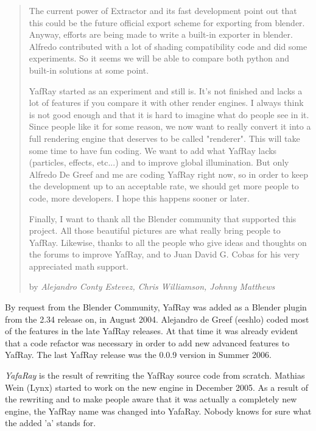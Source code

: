 \begin{quotation}
The current power of Extractor and its fast development point out that this could be the future official export scheme for exporting from blender. Anyway, efforts are being made to write a built-in exporter in blender. Alfredo contributed with a lot of shading compatibility code and did some experiments. So it seems we will be able to compare both python and built-in solutions at some point.

YafRay started as an experiment and still is. It's not finished and lacks a lot of features if you compare it with other render engines. I always think is not good enough and that it is hard to imagine what do people see in it. Since people like it for some reason, we now want to really convert it into a full rendering engine that deserves to be called "renderer". This will take some time to have fun coding. We want to add what YafRay lacks (particles, effects, etc...) and to improve global illumination. But only Alfredo De Greef and me are coding YafRay right now, so in order to keep the development up to an acceptable rate, we should get more people to code, more developers. I hope this happens sooner or later.

Finally, I want to thank all the Blender community that supported this project. All those beautiful pictures are what really bring people to YafRay. Likewise, thanks to all the people who give ideas and thoughts on the forums to improve YafRay, and to Juan David G. Cobas for his very appreciated math support.
\begin{flushright}
by \textit{Alejandro Conty Estevez, Chris Williamson, Johnny Matthews}
\end{flushright}
\end{quotation}

By request from the Blender Community, YafRay was added as a Blender plugin from the 2.34 release on, in August 2004. Alejandro de Greef (eeshlo) coded most of the features in the late YafRay releases. At that time it was already evident that a code refactor was necessary in order to add new advanced features to YafRay. The last YafRay release was the 0.0.9 version in Summer 2006.


\textit{YafaRay} is the result of rewriting the YafRay source code from scratch. Mathias Wein (Lynx) started to work on the new engine in December 2005. As a result of the rewriting and to make people aware that it was actually a completely new engine, the YafRay name was changed into YafaRay. Nobody knows for sure what the added 'a' stands for.

